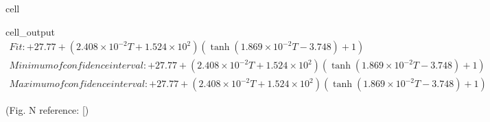 \documentclass[letterpaper,10pt,english]{jupyterBook}
\begin{document}
\begin{sphinxuseclass}{cell}
\begin{sphinxVerbatimOutput}
\begin{sphinxuseclass}{cell_output}
				\sphinxAtStartPar
				\begin{equation*}
					\begin{split}Fit: \boxed{ + 27.77 + \left(2.408 \times 10^{-2} T + 1.524 \times 10^{2}\right) \left(\tanh{\left(1.869 \times 10^{-2} T - 3.748 \right)} + 1\right) }\end{split}
				\end{equation*}\begin{equation*}
					\begin{split}Minimum of confidence interval: \boxed{ + 27.77 + \left(2.408 \times 10^{-2} T + 1.524 \times 10^{2}\right) \left(\tanh{\left(1.869 \times 10^{-2} T - 3.748 \right)} + 1\right) }\end{split}
				\end{equation*}\begin{equation*}
					\begin{split}Maximum of confidence interval: \boxed{ + 27.77 + \left(2.408 \times 10^{-2} T + 1.524 \times 10^{2}\right) \left(\tanh{\left(1.869 \times 10^{-2} T - 3.748 \right)} + 1\right) }\end{split}
				\end{equation*}
				\noindent{}
				
		\end{sphinxuseclass}\end{sphinxVerbatimOutput}
		
	\end{sphinxuseclass}
	\sphinxAtStartPar
	(Fig. N reference: {[}\sphinxhref{https://drive.google.com/file/d/1x23WlpX\_QpUqP5\_4g6sI8XIvImdqyJ9H/view?usp=drive\_link}{Okubo2011}{]})
	
	
\end{document}
